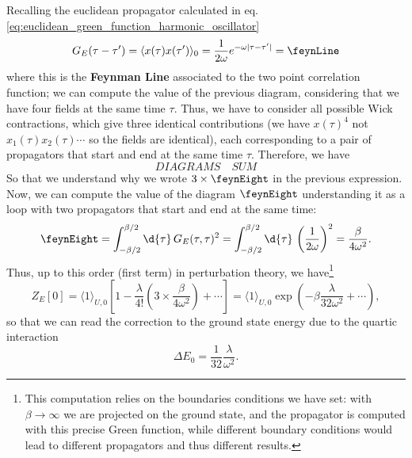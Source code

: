 Recalling the euclidean propagator calculated in eq. \eqref{eq:euclidean_green_function_harmonic_oscillator}
\[
    G_E(\tau - \tau^{\prime}) = \langle x(\tau) x(\tau^{\prime}) \rangle_0 = \frac{1}{2\omega} e^{-\omega \vert \tau - \tau^{\prime} \vert} = \feynLine
\]
where this is the \textbf{Feynman Line} associated to the two point correlation function; we can compute the value of the previous diagram, considering that we have four fields at the same time \(\tau\). Thus, we have to consider all possible Wick contractions, which give three identical contributions (we have \(x(\tau)^4\) not \(x_1(\tau)x_2(\tau)\cdots\) so the fields are identical), each corresponding to a pair of propagators that start and end at the same time \(\tau\). Therefore, we have
\[
    DIAGRAMS \quad SUM
\]
So that we understand why we wrote \(3 \times \feynEight\) in the previous expression. Now, we can compute the value of the diagram \(\feynEight\) understanding it as a loop with two propagators that start and end at the same time:
\[
    \feynEight = \int_{-\beta/2}^{\beta/2} \d{\tau} \, G_E(\tau,\tau)^2 = \int_{-\beta/2}^{\beta/2} \d{\tau} \, \left( \frac{1}{2\omega} \right)^2 = \frac{\beta}{4\omega^2}.
\]
Thus, up to this order (first term) in perturbation theory, we have\footnote{This computation relies on the boundaries conditions we have set: with \(\beta \to  \infty\) we are projected on the ground state, and the propagator is computed with this precise Green function, while different boundary conditions would lead to different propagators and thus different results.}
\[
    Z_E[0] = \langle 1 \rangle_{U,0} \left[ 1 - \frac{\lambda}{4!} \left( 3 \times \frac{\beta}{4\omega^2} \right) + \cdots \right] = \langle 1 \rangle_{U,0} \exp\left( -\beta \frac{\lambda}{32\omega^2} + \cdots \right),
\]
so that we can read the correction to the ground state energy due to the quartic interaction
\[
    \Delta E_0 = \frac{1}{32} \frac{\lambda}{\omega^2}.
\]

